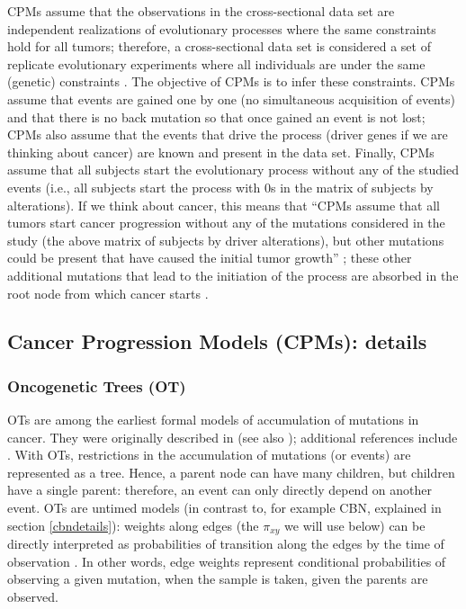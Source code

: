 \documentclass[a4paper,11pt]{article}
\begin{document}
CPMs assume that the observations in the cross-sectional data set are independent realizations of evolutionary processes where the same constraints hold for all tumors; therefore, a cross-sectional data set is considered a set of replicate evolutionary experiments where all individuals are under the same (genetic) constraints \citep{gerstung2011temporal, Beerenwinkel2014, beerenwinkel_computational_2016, diaz2019every}. The objective of CPMs is to infer these constraints. CPMs assume that events are gained one by one (no simultaneous acquisition of events)  and that there is no back mutation so that once gained an event is not lost; CPMs also assume that the events that drive the process (driver genes if we are thinking about cancer) are known and present in the data set. Finally, CPMs assume that all subjects start the evolutionary process without any of the studied events (i.e., all subjects start the process with 0s in the matrix of subjects by alterations). If we think about cancer, this means that ``CPMs assume that all tumors start cancer progression without any of the mutations considered in the study (the above matrix of subjects by driver alterations), but other mutations could be present that have caused the initial tumor growth'' \citep{diaz2019every}; these other additional mutations that lead to the initiation of the process are absorbed in the root node from which cancer starts \citep{Attolini2010a}.



\subsection{Cancer Progression Models (CPMs): details}
\label{cpmdetails}


\subsubsection{Oncogenetic Trees (OT)}\label{otdetails}

OTs are among the earliest formal models of accumulation of mutations in cancer. They were originally described in  \citet{desper1999inferring} (see also \citealp{SimonDesper2000, RadmacherSimon2001}); additional references include \citet{Szabo2008, OTpackage, Szabo2002}. With OTs, restrictions in the accumulation of mutations (or events) are represented as a tree. Hence, a parent node can have many children, but children have a single parent: therefore, an event can only directly depend on another event. OTs are untimed models (in contrast to, for example CBN, explained in section \ref{cbndetails}): weights along edges (the $\pi_{xy}$ we will use below) can be directly interpreted as probabilities of transition along the edges by the time of observation \citep[p.~5]{Szabo2008}. In other words, edge weights represent conditional probabilities of observing a given mutation, when the sample is taken, given the parents are observed.
\end{document}
